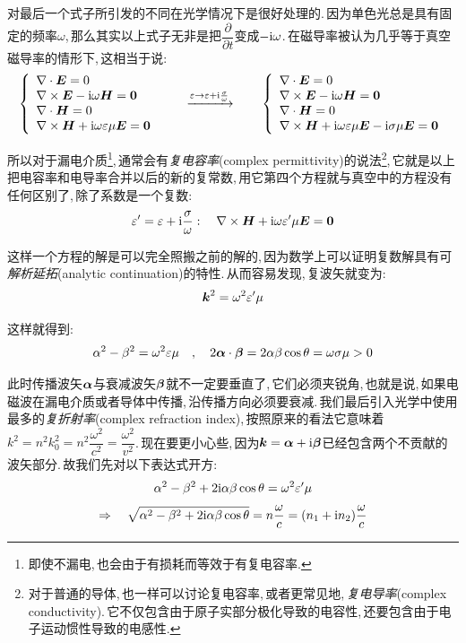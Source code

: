 对最后一个式子所引发的不同在光学情况下是很好处理的.\,因为单色光总是具有固定的频率$\omega$,\,那么其实以上式子无非是把$\dfrac{\partial}{\partial t}$变成$-{\rm i} \omega$.\,在磁导率被认为几乎等于真空磁导率的情形下,\,这相当于说:
\[\left\{ \begin{array}{l} 
\nabla\cdot \boldsymbol{E}=0 \\ 
\nabla\times \boldsymbol{E}-{\rm i} \omega \boldsymbol{H}=\boldsymbol{0} \\
\nabla\cdot \boldsymbol{H}=0 \\
\nabla\times \boldsymbol{H}+{\rm i} \omega \varepsilon\mu\boldsymbol{E}=\boldsymbol{0} \end{array}\right. \qquad \xrightarrow{\varepsilon\rightarrow \varepsilon+{\rm i} \frac{\sigma}{\omega}} \qquad
\left\{ \begin{array}{l} 
\nabla\cdot \boldsymbol{E}=0 \\
\nabla\times \boldsymbol{E}-{\rm i} \omega \boldsymbol{H}=\boldsymbol{0}  \\
\nabla\cdot \boldsymbol{H}=0 \\
\nabla\times \boldsymbol{H}+{\rm i} \omega \varepsilon\mu\boldsymbol{E}-{\rm i}\sigma \mu \boldsymbol{E}=\boldsymbol{0} \end{array}\right.
\]

所以对于漏电介质\footnote{即使不漏电,\,也会由于有损耗而等效于有复电容率.},\,通常会有\emph{复电容率}(complex permittivity)的说法\footnote{对于普通的导体,\,也一样可以讨论复电容率,\,或者更常见地,\,\emph{复电导率}(complex conductivity).\,它不仅包含由于原子实部分极化导致的电容性,\,还要包含由于电子运动惯性导致的电感性.},\,它就是以上把电容率和电导率合并以后的新的复常数,\,用它第四个方程就与真空中的方程没有任何区别了,\,除了系数是一个复数:
\[\varepsilon^\prime =\varepsilon+{\rm i}\frac{\sigma}{\omega}:\quad \nabla\times \boldsymbol{H}+{\rm i} \omega \varepsilon^\prime\mu\boldsymbol{E}=\boldsymbol{0}\]

这样一个方程的解是可以完全照搬之前的解的,\,因为数学上可以证明复数解具有可\emph{解析延拓}(analytic continuation)的特性.\,从而容易发现,\,复波矢就变为:
\[\boldsymbol{k}^2=\omega^2\varepsilon^\prime \mu\]

这样就得到:
\[\alpha^2-\beta^2=\omega^2\varepsilon \mu\quad ,\quad 2\boldsymbol{\alpha}\cdot\boldsymbol{\beta}=2\alpha\beta\cos\theta=\omega\sigma\mu>0\]

此时传播波矢$\boldsymbol{\alpha}$与衰减波矢$\boldsymbol{\beta}$就不一定要垂直了,\,它们必须夹锐角,\,也就是说,\,如果电磁波在漏电介质或者导体中传播,\,沿传播方向必须要衰减.\,我们最后引入光学中使用最多的\emph{复折射率}(complex refraction index),\,按照原来的看法它意味着$k^2=n^2k_0^2=n^2\dfrac{\omega^2}{c^2}=\dfrac{\omega^2}{v^2}$.\,现在要更小心些,\,因为$\boldsymbol{k}=\boldsymbol{\alpha}+{\rm i} \boldsymbol{\beta}$已经包含两个不贡献的波矢部分.\,故我们先对以下表达式开方:
\[\alpha^2-\beta^2+2{\rm i} \alpha\beta\cos\theta=\omega^2\varepsilon^\prime \mu\]
\[\Rightarrow \quad \sqrt{\alpha^2-\beta^2+2{\rm i} \alpha\beta\cos\theta}=n\frac{\omega}{c}=(n_1+{\rm i} n_2)\frac{\omega}{c}\]

